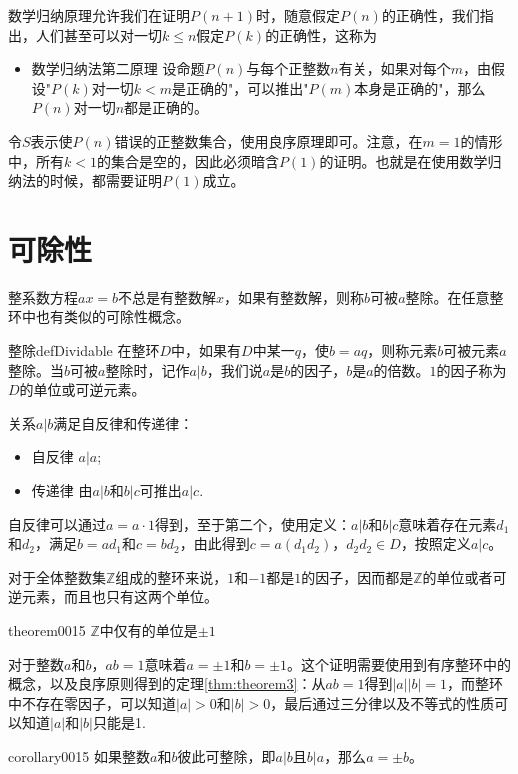 数学归纳原理允许我们在证明$P(n+1)$时，随意假定$P(n)$的正确性，我们指出，人们甚至可以对一切$k \le n$假定$P(k)$的正确性，这称为
\begin{itemize}
\item \textcolor{main}{数学归纳法第二原理} 设命题$P(n)$与每个正整数$n$有关，如果对每个$m$，由假设"$P(k)$对一切$k <m$是正确的"，可以推出"$P(m)$本身是正确的"，那么$P(n)$对一切$n$都是正确的。
\end{itemize}

令$S$表示使$P(n)$错误的正整数集合，使用良序原理即可。注意，在$m=1$的情形中，所有$k<1$的集合是空的，因此必须暗含$P(1)$的证明。也就是在使用数学归纳法的时候，都需要证明$P(1)$成立。

\section{可除性}
整系数方程$ax=b$不总是有整数解$x$，如果有整数解，则称$b$可被$a$整除。在任意整环中也有类似的可除性概念。
\begin{definition}{整除}{defDividable}
在整环$D$中，如果有$D$中某一$q$，使$b=aq$，则称元素$b$可被元素$a$整除。当$b$可被$a$整除时，记作$a|b$，我们说$a$是$b$的因子，$b$是$a$的倍数。$1$的因子称为$D$的单位或可逆元素。
\end{definition}
关系$a|b$满足自反律和传递律：
\begin{itemize}
\item 自反律 $a|a$;
\item 传递律 由$a|b$和$b|c$可推出$a|c$.
\end{itemize}
自反律可以通过$a=a\cdot{}1$得到，至于第二个，使用定义：$a|b$和$b|c$意味着存在元素$d_1$和$d_2$，满足$b=ad_1$和$c=bd_2$，由此得到$c=a(d_1d_2)$，$d_2d_2 \in D$，按照定义$a|c$。


对于全体整数集$\mathbb{Z}$组成的整环来说，$1$和$-1$都是$1$的因子，因而都是$\mathbb{Z}$的单位或者可逆元素，而且也只有这两个单位。
\begin{theorem}{}{theorem0015}
$\mathbb{Z}$中仅有的单位是$\pm1$
\end{theorem}
对于整数$a$和$b$，$ab=1$意味着$a=\pm1$和$b=\pm1$。这个证明需要使用到有序整环中的概念，以及良序原则得到的定理\ref{thm:theorem3}：从$ab=1$得到$|a||b|=1$，而整环中不存在零因子，可以知道$|a|>0$和$|b|>0$，最后通过三分律以及不等式的性质可以知道$|a|$和$|b|$只能是1.

\begin{corollary}{}{corollary0015}
如果整数$a$和$b$彼此可整除，即$a|b$且$b|a$，那么$a=\pm{}b$。
\end{corollary}

